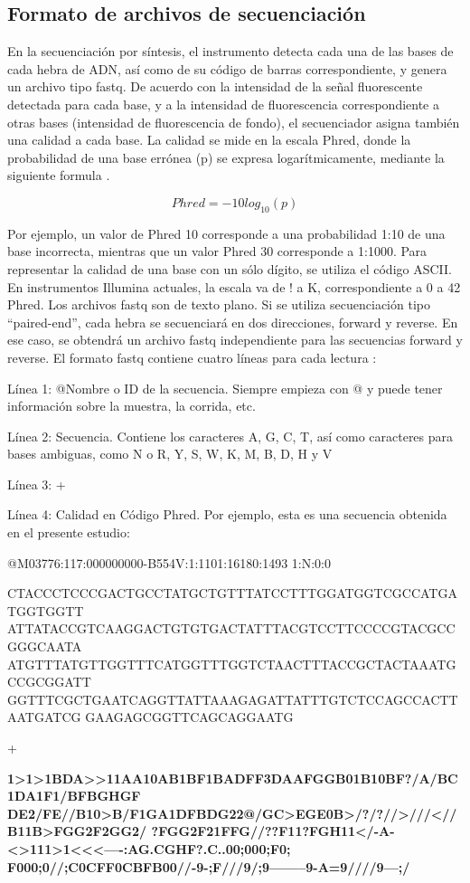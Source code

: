 \documentclass[12pt,letterpaper,oneside]{report}
\begin{document}
\subsection{Formato de archivos de secuenciación}
En la secuenciación por síntesis, el instrumento detecta cada una de las bases de cada hebra de ADN, así como de su código de barras correspondiente, y genera un archivo tipo fastq. De acuerdo con la intensidad de la señal fluorescente detectada para cada base, y a la intensidad de fluorescencia correspondiente a otras bases (intensidad de fluorescencia de fondo), el secuenciador asigna también una calidad a cada base. La calidad se mide en la escala Phred, donde la probabilidad de una base errónea (p) se expresa logarítmicamente, mediante la siguiente formula \autocite{Cock2009}.
\begin{large}
 \[Phred=-10log_{10}(p)\]
\end{large}
Por ejemplo, un valor de Phred 10 corresponde a una probabilidad 1:10 de una base incorrecta, mientras que un valor Phred 30 corresponde a 1:1000. Para representar la calidad de una base con un sólo dígito, se utiliza el código ASCII. En instrumentos Illumina actuales, la escala va de ! a K, correspondiente a 0 a 42 Phred. Los archivos fastq son de texto plano. Si se utiliza secuenciación tipo “paired-end”, cada hebra se secuenciará en dos direcciones, forward y reverse. En ese caso, se obtendrá un archivo fastq independiente para las secuencias forward y reverse. El formato fastq contiene cuatro líneas para cada lectura \autocite{Cock2009}:
\par 
Línea 1: @Nombre o ID de la secuencia. Siempre empieza con @ y puede tener información sobre la muestra, la corrida, etc.
\par
Línea 2: Secuencia. Contiene los caracteres A, G, C, T, así como caracteres para bases ambiguas, como N o R, Y, S, W, K, M, B, D, H y V
\par
Línea 3: +
\par
Línea 4: Calidad en Código Phred. 
Por ejemplo, esta es una secuencia obtenida en el presente estudio: 
\par
@M03776:117:000000000-B554V:1:1101:16180:1493 1:N:0:0
\begin{sloppypar}
CTACCCTCCCGACTGCCTATGCTGTTTATCCTTTGGATGGTCGCCATGATGGTGGTT
ATTATACCGTCAAGGACTGTGTGACTATTTACGTCCTTCCCCGTACGCCGGGCAATA
ATGTTTATGTTGGTTTCATGGTTTGGTCTAACTTTACCGCTACTAAATGCCGCGGATT
GGTTTCGCTGAATCAGGTTATTAAAGAGATTATTTGTCTCCAGCCACTTAATGATCG
GAAGAGCGGTTCAGCAGGAATG
\end{sloppypar}
+
\begin{sloppypar}
\textbf{1\textgreater 1\textgreater 1BDA\textgreater \textgreater 11AA10AB1BF1BADFF3DAAFGGB01B10BF?/A/BC1DA1F1/BFBGHGF
DE2/FE//B10\textgreater B/F1GA1DFBDG22@/GC\textgreater EGE0B\textgreater /?/?//\textgreater ///\textless //B11B\textgreater FGG2F2GG2/
?FGG2F21FFG//??F11?FGH11\textless /-A-\textless \textgreater 111\textgreater 1\textless \textless \textless ----:AG.CGHF?.C..00;000;F0;
F000;0//;C0CFF0CBFB00//-9-;F///9/;9--------9-A=9////9---;/}
\end{sloppypar}
\newpage
\end{document}
